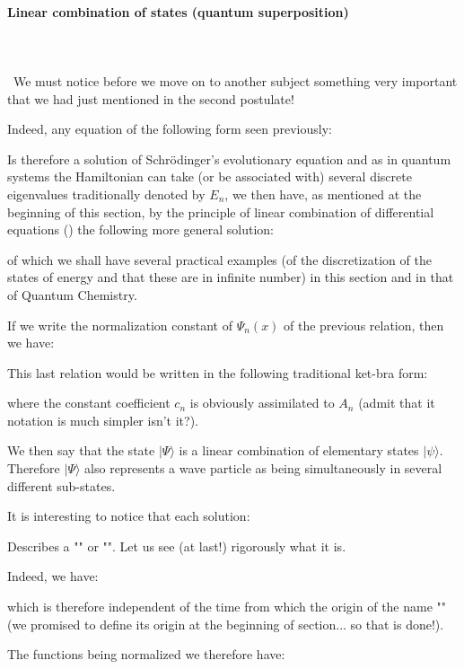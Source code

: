 	
	\paragraph{Linear combination of states (quantum superposition)}\mbox{}\\\\\
	We must notice before we move on to another subject something very important that we had just mentioned in the second postulate!

	Indeed, any equation of the following form seen previously:
	
	Is therefore a solution of Schrödinger's evolutionary equation and as in quantum systems the Hamiltonian can take (or be associated with) several discrete eigenvalues traditionally denoted by $E_n$, we then have, as mentioned at the beginning of this section, by the principle of linear combination of differential equations () the following more general solution:
	
	of which we shall have several practical examples (of the discretization of the states of energy and that these are in infinite number) in this section and in that of Quantum Chemistry.

	If we write the normalization constant of $\Psi_n(x)$ of the previous relation, then we have:
	
	This last relation would be written in the following traditional ket-bra form:
	
	where the constant coefficient $c_n$ is obviously assimilated to $A_n$ (admit that it notation is much simpler isn't it?).
	
	We then say that the state $|\Psi\rangle$ is a linear combination of elementary states $|\psi\rangle$. Therefore $|\Psi\rangle$ also represents a wave particle as being simultaneously in several different sub-states.

	It is interesting to notice that each solution:
	
	Describes a "" or "". Let us see (at last!) rigorously what it is.

	Indeed, we have:
	
	which is therefore independent of the time from which the origin of the name "" (we promised to define its origin at the beginning of section... so that is done!).

	The functions being normalized we therefore have:
	

